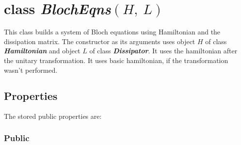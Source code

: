 \documentclass{article}
\numberwithin{equation}{section}
\numberwithin{figure}{section}
\numberwithin{table}{section}
\newcommand\codeclass[1]{\ttfamily\textbf{\textit{#1}}\rmfamily}
\begin{document}
\section*{\textbf{class} \codeclass{BlochEqns}$(H,\ L)$}

This class builds a system of Bloch equations using Hamiltonian and the dissipation matrix. The constructor as its arguments uses object $H$ of class \codeclass{Hamiltonian} and object $L$ of class \codeclass{Dissipator}. It uses the hamiltonian after the unitary transformation. It uses basic hamiltonian, if the transformation wasn't performed.

\subsection*{Properties}

The stored public properties are:

\subsubsection*{Public}
\end{document}
